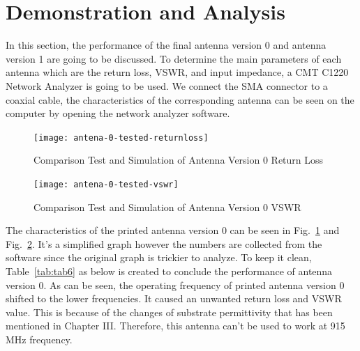\documentclass[conference]{IEEEtran}
\begin{document}

\section{Demonstration and Analysis}
In this section, the performance of the final antenna version 0 and antenna version 1 are going to be discussed. To determine the main parameters of each antenna which are the return loss, VSWR, and input impedance, a CMT C1220 Network Analyzer is going to be used. We connect the SMA connector to a coaxial cable, the characteristics of the corresponding antenna can be seen on the computer by opening the network analyzer software.
\begin{figure}[htbp]
    \centering
    \texttt{[image: antena-0-tested-returnloss]}
    \caption{Comparison Test and Simulation of Antenna Version 0 Return Loss}
    \label{fig6}
\end{figure}

\begin{figure}[htbp]
    \centering
    \texttt{[image: antena-0-tested-vswr]}
    \caption{Comparison Test and Simulation of Antenna Version 0 VSWR}
    \label{fig7}
\end{figure}

The characteristics of the printed antenna version 0 can be seen in Fig.~\ref{fig6} and Fig.~\ref{fig7}. It's a simplified graph however the numbers are collected from the software since the original graph is trickier to analyze. To keep it clean, Table~\ref{tab:tab6} as below is created to conclude the performance of antenna version 0. As can be seen, the operating frequency of printed antenna version 0 shifted to the lower frequencies. It caused an unwanted return loss and VSWR value. This is because of the changes of substrate permittivity that has been mentioned in Chapter III. Therefore, this antenna can't be used to work at 915 MHz frequency.
\end{document}
